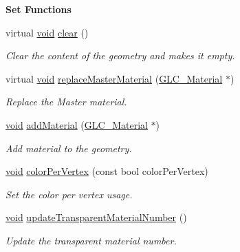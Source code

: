 \begin{Indent}{\bf Set Functions}\par
\begin{DoxyCompactItemize}
\item 
virtual \hyperlink{group___u_a_v_objects_plugin_ga444cf2ff3f0ecbe028adce838d373f5c}{void} \hyperlink{class_g_l_c___geometry_a6d5ea8d6790556a535db1530bbed31e6}{clear} ()
\begin{DoxyCompactList}\small\item\em Clear the content of the geometry and makes it empty. \end{DoxyCompactList}\item 
virtual \hyperlink{group___u_a_v_objects_plugin_ga444cf2ff3f0ecbe028adce838d373f5c}{void} \hyperlink{class_g_l_c___geometry_a16015c31919c47c6cdcfb4aa79de9b70}{replace\-Master\-Material} (\hyperlink{class_g_l_c___material}{G\-L\-C\-\_\-\-Material} $\ast$)
\begin{DoxyCompactList}\small\item\em Replace the Master material. \end{DoxyCompactList}\item 
\hyperlink{group___u_a_v_objects_plugin_ga444cf2ff3f0ecbe028adce838d373f5c}{void} \hyperlink{class_g_l_c___geometry_a3decda9ebcb68e8546082b39ddb0bf3e}{add\-Material} (\hyperlink{class_g_l_c___material}{G\-L\-C\-\_\-\-Material} $\ast$)
\begin{DoxyCompactList}\small\item\em Add material to the geometry. \end{DoxyCompactList}\item 
\hyperlink{group___u_a_v_objects_plugin_ga444cf2ff3f0ecbe028adce838d373f5c}{void} \hyperlink{class_g_l_c___geometry_a63554feabeaf84c3c8ff03e6a435e89a}{color\-Per\-Vertex} (const bool color\-Per\-Vertex)
\begin{DoxyCompactList}\small\item\em Set the color per vertex usage. \end{DoxyCompactList}\item 
\hyperlink{group___u_a_v_objects_plugin_ga444cf2ff3f0ecbe028adce838d373f5c}{void} \hyperlink{class_g_l_c___geometry_a202e5efd15a3d59b27584659f32ca5ee}{update\-Transparent\-Material\-Number} ()
\begin{DoxyCompactList}\small\item\em Update the transparent material number. \end{DoxyCompactList}\item 

\end{DoxyCompactItemize}
\end{Indent}
